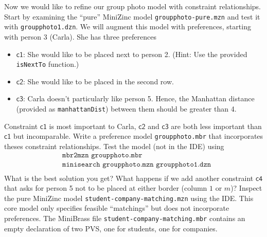 \documentclass[a4paper,10pt,fleqn]{article}
\begin{document}
Now we would like to refine our group photo model with constraint relationships.
Start by examining the ``pure'' MiniZinc model \texttt{groupphoto-pure.mzn} and test it with \texttt{groupphoto1.dzn}.
We will augment this model with preferences, starting with person 3 (Carla). She has three preferences
\begin{itemize}
\item $\mathsf{c1}$: She would like to be placed next to person 2. (Hint: Use the provided \texttt{isNextTo} function.)
\item $\mathsf{c2}$: She would like to be placed in the second row.
\item $\mathsf{c3}$: Carla doesn't particularly like person 5. Hence, the Manhattan distance (provided as \texttt{manhattanDist}) between them should be greater than 4.
\end{itemize}
Constraint $\mathsf{c1}$ is most important to Carla, $\mathsf{c2}$ and $\mathsf{c3}$ are both less important than $\mathsf{c1}$ but incomparable. Write a preference model \texttt{groupphoto.mbr} that incorporates theses constraint relationships. Test the model (not in the IDE) using
\begin{align*}
&\texttt{mbr2mzn groupphoto.mbr} \\
&\texttt{minisearch groupphoto.mzn groupphoto1.dzn} \\
\end{align*}
What is the best solution you get? What happens if we add another constraint $\mathsf{c4}$ that asks for person 5 not to be placed at either border (column $1$ or $m$)?
Inspect the pure MiniZinc model \texttt{student-company-matching.mzn} using the IDE. This core model only specifies feasible ``matchings'' but does not incorporate preferences. The MiniBrass file \texttt{student-company-matching.mbr} contains an empty declaration of two PVS, one for students, one for companies.
\end{document}
